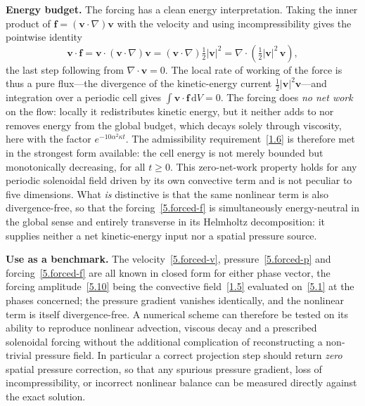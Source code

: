 \documentclass[11pt]{jfm}
\let\ge=\geqslant  \let\geq=\geqslant
\numberwithin{equation}{section}
\begin{document}
\medskip
\noindent\textbf{Energy budget.} The forcing has a clean energy interpretation. Taking the inner
product of $\boldsymbol{f}=(\boldsymbol{v}\cdot\nabla)\boldsymbol{v}$ with the velocity and using
incompressibility gives the pointwise identity
\begin{equation}
\label{eq:energy-flux}
\boldsymbol{v}\cdot\boldsymbol{f}
=\boldsymbol{v}\cdot(\boldsymbol{v}\cdot\nabla)\boldsymbol{v}
=(\boldsymbol{v}\cdot\nabla)\tfrac{1}{2}|\boldsymbol{v}|^2
=\nabla\cdot\!\left(\tfrac{1}{2}|\boldsymbol{v}|^2\,\boldsymbol{v}\right),
\end{equation}
the last step following from $\nabla\cdot\boldsymbol{v}=0$. The local rate of working of the force
is thus a pure flux---the divergence of the kinetic-energy current
$\tfrac12|\boldsymbol{v}|^2\boldsymbol{v}$---and integration over a periodic cell gives
$\int\boldsymbol{v}\cdot\boldsymbol{f}\,\mathrm{d}V=0$. The forcing does \emph{no net work} on the
flow: locally it redistributes kinetic energy, but it neither adds to nor removes energy from the
global budget, which decays solely through viscosity, here with the factor
$e^{-10\alpha^2\kappa t}$. The admissibility requirement~\eqref{1.6} is therefore met in the
strongest form available: the cell energy is not merely bounded but monotonically decreasing, for
all $t\ge0$. This zero-net-work property holds for any periodic solenoidal field
driven by its own convective term and is not peculiar to five dimensions. What \emph{is}
distinctive is that the same nonlinear term is also divergence-free, so that the forcing~\eqref{5.forced-f} is
simultaneously energy-neutral in the global sense and entirely transverse in its Helmholtz
decomposition: it supplies neither a net kinetic-energy input nor a spatial pressure source.

\medskip
\noindent\textbf{Use as a benchmark.} The velocity~\eqref{5.forced-v}, pressure~\eqref{5.forced-p}
and forcing~\eqref{5.forced-f} are all known in closed form for either phase vector, the forcing
amplitude~\eqref{5.10} being the convective field~\eqref{1.5} evaluated on~\eqref{5.1} at the
phases concerned; the pressure gradient vanishes identically, and the nonlinear term is itself
divergence-free. A numerical scheme can therefore be tested on its ability to reproduce nonlinear
advection, viscous decay and a prescribed solenoidal forcing without the additional complication
of reconstructing a non-trivial pressure field. In particular a correct projection step should
return \emph{zero} spatial pressure correction, so that any spurious pressure gradient, loss of
incompressibility, or incorrect nonlinear balance can be measured directly against the exact
solution.
\end{document}
